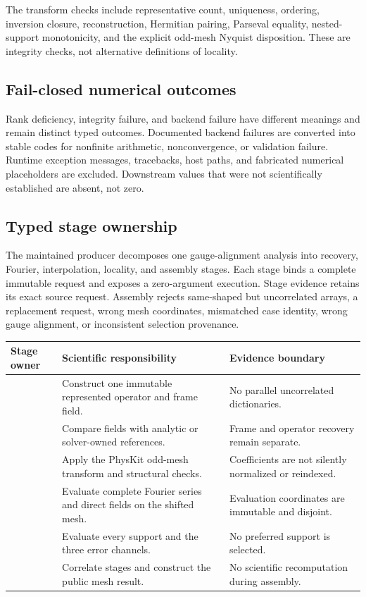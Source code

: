 \documentclass[11pt]{article}
\begin{document}
The transform checks include representative count, uniqueness, ordering, inversion
closure, reconstruction, Hermitian pairing, Parseval equality, nested-support
monotonicity, and the explicit odd-mesh Nyquist disposition. These are integrity checks,
not alternative definitions of locality.

\subsection{Fail-closed numerical outcomes}

Rank deficiency, integrity failure, and backend failure have different meanings and
remain distinct typed outcomes. Documented backend failures are converted into stable
codes for nonfinite arithmetic, nonconvergence, or validation failure. Runtime exception
messages, tracebacks, host paths, and fabricated numerical placeholders are excluded.
Downstream values that were not scientifically established are absent, not zero.

\subsection{Typed stage ownership}

The maintained producer decomposes one gauge-alignment analysis into recovery, Fourier,
interpolation, locality, and assembly stages. Each stage binds a complete immutable
request and exposes a zero-argument execution. Stage evidence retains its exact source
request. Assembly rejects same-shaped but uncorrelated arrays, a replacement request,
wrong mesh coordinates, mismatched case identity, wrong gauge alignment, or inconsistent
selection provenance.

\begin{center}\small
\begin{tabularx}{\textwidth}{>{\raggedright\arraybackslash}p{}YY}
\toprule
\textbf{Stage owner} & \textbf{Scientific responsibility} & \textbf{Evidence boundary} \\
\midrule
{} & Construct one immutable represented operator and frame field. & No parallel uncorrelated dictionaries. \\
 & Compare fields with analytic or solver-owned references. & Frame and operator recovery remain separate. \\
 & Apply the PhysKit odd-mesh transform and structural checks. & Coefficients are not silently normalized or reindexed. \\
 & Evaluate complete Fourier series and direct fields on the shifted mesh. & Evaluation coordinates are immutable and disjoint. \\
 & Evaluate every support and the three error channels. & No preferred support is selected. \\
 & Correlate stages and construct the public mesh result. & No scientific recomputation during assembly. \\
\bottomrule
\end{tabularx}
\end{center}
\end{document}
